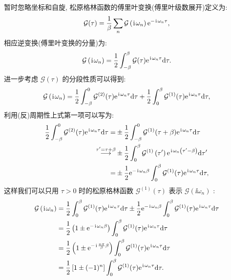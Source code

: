 暂时忽略坐标和自旋, 松原格林函数的傅里叶变换(傅里叶级数展开)定义为:
\begin{equation}
\mathcal{G}(\tau)=\frac{1}{\beta} \sum_n \mathcal{G}\left(\hspace{0.1em}\mathrm{i}\hspace{0.1em} \omega_n\right) \mathrm{e}^{-\hspace{0.1em}\mathrm{i}\hspace{0.1em} \omega_n \tau},
\end{equation}
相应逆变换(傅里叶变换的分量)为:
\begin{equation}
\mathcal{G}\left(\hspace{0.1em}\mathrm{i}\hspace{0.1em} \omega_n\right)=\frac{1}{2} \int_{-\beta}^\beta \mathcal{G}(\tau) \mathrm{e}^{\hspace{0.1em}\mathrm{i}\hspace{0.1em} \omega_n \tau}\mathrm{d} \tau .
\end{equation}
进一步考虑 $\mathcal{G}(\tau)$ 的分段性质可以得到:
\begin{equation}
\mathcal{G}\left(\hspace{0.1em}\mathrm{i}\hspace{0.1em} \omega_n\right)=\frac{1}{2} \int_{-\beta}^0 \mathcal{G}^{(2)}(\tau) \mathrm{e}^{\hspace{0.1em}\mathrm{i}\hspace{0.1em} \omega_n \tau} \mathrm{d} \tau+\frac{1}{2} \int_0^\beta \mathcal{G}^{(1)}(\tau) \mathrm{e}^{\hspace{0.1em}\mathrm{i}\hspace{0.1em} \omega_n \tau} \mathrm{d} \tau,
\end{equation}
利用(反)周期性上式第一项可以写为:
\begin{align}
\frac{1}{2} \int_{-\beta}^0 \mathcal{G}^{(2)}(\tau) \mathrm{e}^{\hspace{0.1em}\mathrm{i}\hspace{0.1em} \omega_n \tau} \mathrm{d} \tau  =&\pm \frac{1}{2} \int_{-\beta}^0 \mathcal{G}^{(1)}(\tau+\beta) \mathrm{e}^{\hspace{0.1em}\mathrm{i}\hspace{0.1em} \omega_n \tau} \mathrm{d} \tau \nonumber\\
\stackrel{\tau^{\prime}=\tau+\beta}{\longrightarrow} & \pm \frac{1}{2} \int_0^\beta \mathcal{G}^{(1)}\left(\tau^{\prime}\right) \mathrm{e}^{\hspace{0.1em}\mathrm{i}\hspace{0.1em} \omega_n\left(\tau^{\prime}-\beta\right)} \mathrm{d} \tau^{\prime}\nonumber \\
=&\pm \frac{1}{2} \mathrm{e}^{-\hspace{0.1em}\mathrm{i}\hspace{0.1em} \omega_n \beta} \int_0^\beta \mathcal{G}^{(1)}(\tau) \mathrm{e}^{\hspace{0.1em}\mathrm{i}\hspace{0.1em} \omega_n \tau}\mathrm{d} \tau ,
\end{align}
这样我们可以只用 $\tau>0$ 时的松原格林函数 $\mathcal{G}^{(1)}(\tau)$ 表示 $\mathcal{G}\left(\ii \omega_n\right)$ :
\begin{align}
\mathcal{G}\left(\hspace{0.1em}\mathrm{i}\hspace{0.1em} \omega_n\right) & =\frac{1}{2} \int_0^{\beta} \mathcal{G}^{(1)}(\tau) \mathrm{e}^{\hspace{0.1em}\mathrm{i}\hspace{0.1em} \omega_n \tau} \mathrm{d} \tau \pm \frac{1}{2} \mathrm{e}^{-\hspace{0.1em}\mathrm{i}\hspace{0.1em} \omega_n \beta}  \int_0^\beta \mathcal{G}^{(1)}(\tau) \mathrm{e}^{\hspace{0.1em}\mathrm{i}\hspace{0.1em} \omega_n \tau} \mathrm{d} \tau \nonumber\\
& =\frac{1}{2}\left(1 \pm \mathrm{e}^{-\hspace{0.1em}\mathrm{i}\hspace{0.1em} \omega_n \beta}\right) \int_0^\beta \mathcal{G}^{(1)}(\tau) \mathrm{e}^{\hspace{0.1em}\mathrm{i}\hspace{0.1em} \omega_n \tau}\mathrm{d} \tau\nonumber\\
& =\frac{1}{2}\left(1 \pm \mathrm{e}^{-\hspace{0.1em}\mathrm{i}\hspace{0.1em} \frac{n\pi}{\beta}\beta}\right) \int_0^\beta \mathcal{G}^{(1)}(\tau) \mathrm{e}^{\hspace{0.1em}\mathrm{i}\hspace{0.1em} \omega_n \tau}\mathrm{d} \tau\nonumber\\
& =\frac{1}{2}\left[1 \pm(-1)^n\right] \int_0^\beta \mathcal{G}^{(1)}(\tau) \mathrm{e}^{\hspace{0.1em}\mathrm{i}\hspace{0.1em} \omega_n \tau}\mathrm{d} \tau.
\end{align}

